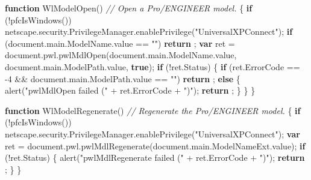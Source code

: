 \documentclass[]{article}
\newenvironment{Shaded}{}{}
\newcommand{\KeywordTok}[1]{\textcolor[rgb]{0.00,0.44,0.13}{\textbf{{#1}}}}
\newcommand{\DecValTok}[1]{\textcolor[rgb]{0.25,0.63,0.44}{{#1}}}
\newcommand{\StringTok}[1]{\textcolor[rgb]{0.25,0.44,0.63}{{#1}}}
\newcommand{\CommentTok}[1]{\textcolor[rgb]{0.38,0.63,0.69}{\textit{{#1}}}}
\newcommand{\OtherTok}[1]{\textcolor[rgb]{0.00,0.44,0.13}{{#1}}}
\newcommand{\FunctionTok}[1]{\textcolor[rgb]{0.02,0.16,0.49}{{#1}}}
\newcommand{\NormalTok}[1]{{#1}}
\begin{document}
\begin{Shaded}
\begin{Highlighting}[]
\KeywordTok{function} \FunctionTok{WlModelOpen}\NormalTok{()}
\CommentTok{//  Open a Pro/ENGINEER model.}
\NormalTok{\{}
  \KeywordTok{if} \NormalTok{(!}\FunctionTok{pfcIsWindows}\NormalTok{())}
    \OtherTok{netscape}\NormalTok{.}\OtherTok{security}\NormalTok{.}\OtherTok{PrivilegeManager}\NormalTok{.}\FunctionTok{enablePrivilege}\NormalTok{(}\StringTok{"UniversalXPConnect"}\NormalTok{);}
  \KeywordTok{if} \NormalTok{(}\OtherTok{document}\NormalTok{.}\OtherTok{main}\NormalTok{.}\OtherTok{ModelName}\NormalTok{.}\FunctionTok{value} \NormalTok{== }\StringTok{""}\NormalTok{)}
    \KeywordTok{return} \NormalTok{;}
  \KeywordTok{var} \NormalTok{ret = }\OtherTok{document}\NormalTok{.}\OtherTok{pwl}\NormalTok{.}\FunctionTok{pwlMdlOpen}\NormalTok{(}\OtherTok{document}\NormalTok{.}\OtherTok{main}\NormalTok{.}\OtherTok{ModelName}\NormalTok{.}\FunctionTok{value}\NormalTok{,}
                    \OtherTok{document}\NormalTok{.}\OtherTok{main}\NormalTok{.}\OtherTok{ModelPath}\NormalTok{.}\FunctionTok{value}\NormalTok{, }\KeywordTok{true}\NormalTok{);}
  \KeywordTok{if} \NormalTok{(!}\OtherTok{ret}\NormalTok{.}\FunctionTok{Status}\NormalTok{)}
    \NormalTok{\{}
      \KeywordTok{if} \NormalTok{(}\OtherTok{ret}\NormalTok{.}\FunctionTok{ErrorCode} \NormalTok{== -}\DecValTok{4} \NormalTok{&& }\OtherTok{document}\NormalTok{.}\OtherTok{main}\NormalTok{.}\OtherTok{ModelPath}\NormalTok{.}\FunctionTok{value} \NormalTok{== }\StringTok{""}\NormalTok{)}
    \KeywordTok{return} \NormalTok{;}
      \KeywordTok{else}
        \NormalTok{\{}
      \FunctionTok{alert}\NormalTok{(}\StringTok{"pwlMdlOpen failed ("} \NormalTok{+ }\OtherTok{ret}\NormalTok{.}\FunctionTok{ErrorCode} \NormalTok{+ }\StringTok{")"}\NormalTok{);}
      \KeywordTok{return} \NormalTok{;}
        \NormalTok{\}}
    \NormalTok{\}}
\NormalTok{\}}

\KeywordTok{function} \FunctionTok{WlModelRegenerate}\NormalTok{()}
\CommentTok{//  Regenerate the Pro/ENGINEER model.}
\NormalTok{\{}
  \KeywordTok{if} \NormalTok{(!}\FunctionTok{pfcIsWindows}\NormalTok{())}
    \OtherTok{netscape}\NormalTok{.}\OtherTok{security}\NormalTok{.}\OtherTok{PrivilegeManager}\NormalTok{.}\FunctionTok{enablePrivilege}\NormalTok{(}\StringTok{"UniversalXPConnect"}\NormalTok{);}
  \KeywordTok{var} \NormalTok{ret = }\OtherTok{document}\NormalTok{.}\OtherTok{pwl}\NormalTok{.}\FunctionTok{pwlMdlRegenerate}\NormalTok{(}\OtherTok{document}\NormalTok{.}\OtherTok{main}\NormalTok{.}\OtherTok{ModelNameExt}\NormalTok{.}\FunctionTok{value}\NormalTok{);}
  \KeywordTok{if} \NormalTok{(!}\OtherTok{ret}\NormalTok{.}\FunctionTok{Status}\NormalTok{)}
    \NormalTok{\{}
      \FunctionTok{alert}\NormalTok{(}\StringTok{"pwlMdlRegenerate failed ("} \NormalTok{+ }\OtherTok{ret}\NormalTok{.}\FunctionTok{ErrorCode} \NormalTok{+ }\StringTok{")"}\NormalTok{);}
      \KeywordTok{return} \NormalTok{;}
    \NormalTok{\}}
\NormalTok{\}}


\end{Highlighting}
\end{Shaded}
\end{document}
